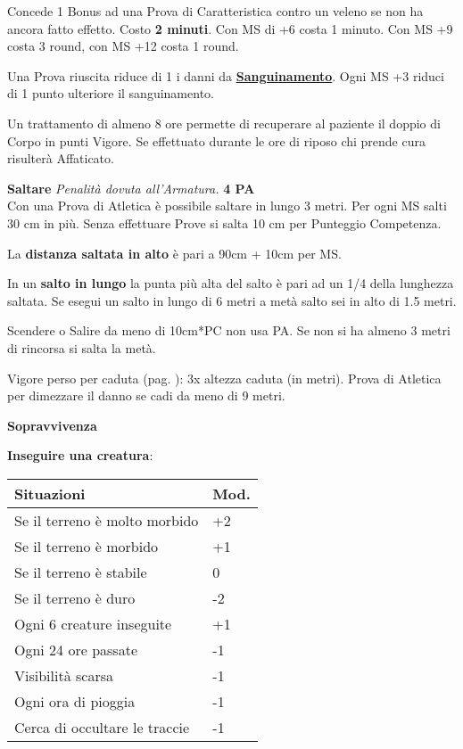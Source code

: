 \documentclass[12pt,a4paper,twoside,openany]{book}
\begin{document}
\begin{multicols}{2}
Concede 1 Bonus ad una Prova di Caratteristica contro un veleno se non ha ancora fatto effetto. Costo \textbf{2 minuti}. Con MS di +6 costa 1 minuto. Con MS +9 costa 3 round, con MS +12 costa 1 round.

Una Prova riuscita riduce di 1 i danni da \hyperlink{sanguinamento}{\textbf{Sanguinamento}}. Ogni MS +3 riduci di 1 punto ulteriore il sanguinamento.

Un trattamento di almeno 8 ore permette di recuperare al paziente il doppio di Corpo in punti Vigore. Se effettuato durante le ore di riposo chi prende cura risulterà Affaticato.

\medskip

\textbf{Saltare} \textit{Penalità dovuta all'Armatura.} \textbf{4 PA}\\

Con una Prova di Atletica è possibile saltare in lungo 3 metri. Per ogni MS salti 30 cm in più. Senza effettuare Prove si salta 10 cm per Punteggio Competenza.

La \textbf{distanza saltata in alto} è pari a 90cm + 10cm per MS.

In un \textbf{salto in lungo} la punta più alta del salto è pari ad un 1/4 della lunghezza saltata. Se esegui un salto in lungo di 6 metri a metà salto sei in alto di 1.5 metri.

Scendere o Salire da meno di 10cm*PC non usa PA. Se non si ha almeno 3 metri di rincorsa si salta la metà.

Vigore perso per caduta (pag. \pageref{cadute}): 3x altezza caduta (in metri). Prova di Atletica per dimezzare il danno se cadi da meno di 9 metri.

\medskip

\textbf{Sopravvivenza}

\smallskip

\textbf{Inseguire una creatura}:

\begin{tabular}{ll}
	Situazioni & Mod.\\
	\toprule
	Se il terreno è molto morbido& +2\\
	Se il terreno è morbido& +1\\
	Se il terreno è stabile& 0\\
	Se il terreno è duro& -2\\
	Ogni 6 creature inseguite& +1\\
	Ogni 24 ore passate & -1\\
	Visibilità scarsa&-1\\
	Ogni ora di pioggia&-1 \\
	Cerca di occultare le traccie& -1\\
\end{tabular}\\


\end{multicols}
\end{document}
